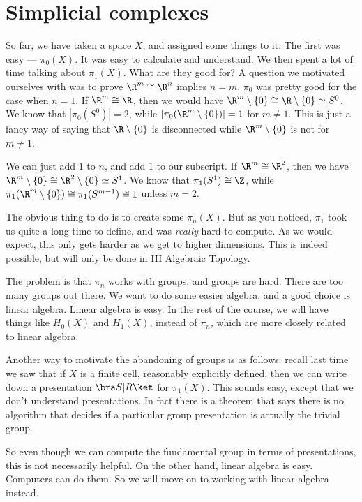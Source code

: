 \documentclass[a4paper]{article}
\begin{document}
\section{Simplicial complexes}
So far, we have taken a space $X$, and assigned some things to it. The first was easy --- $\pi_0(X)$. It was easy to calculate and understand. We then spent a lot of time talking about $\pi_1(X)$. What are they good for? A question we motivated ourselves with was to prove $\R^m \cong \R^n$ implies $n = m$. $\pi_0$ was pretty good for the case when $n = 1$. If $\R^m \cong \R$, then we would have $\R^m \setminus \{0\} \cong \R\setminus \{0\} \simeq S^0$. We know that $|\pi_0(S^0)| = 2$, while $|\pi_0(\R^m \setminus \{0\})| = 1$ for $m \not= 1$. This is just a fancy way of saying that $\R \setminus \{0\}$ is disconnected while $\R^m \setminus \{0\}$ is not for $m \not= 1$.

We can just add $1$ to $n$, and add $1$ to our subscript. If $\R^m \cong \R^2$, then we have $\R^m \setminus \{0\} \cong \R^2 \setminus \{0\} \simeq S^1$. We know that $\pi_1(S^1) \cong \Z$, while $\pi_1(\R^m \setminus \{0\}) \cong \pi_1(S^{m - 1}) \cong 1$ unless $m = 2$.

The obvious thing to do is to create some $\pi_n(X)$. But as you noticed, $\pi_1$ took us quite a long time to define, and was \emph{really} hard to compute. As we would expect, this only gets harder as we get to higher dimensions. This is indeed possible, but will only be done in III Algebraic Topology.

The problem is that $\pi_n$ works with groups, and groups are hard. There are too many groups out there. We want to do some easier algebra, and a good choice is linear algebra. Linear algebra is easy. In the rest of the course, we will have things like $H_0(X)$ and $H_1(X)$, instead of $\pi_n$, which are more closely related to linear algebra.

Another way to motivate the abandoning of groups is as follows: recall last time we saw that if $X$ is a finite cell, reasonably explicitly defined, then we can write down a presentation $\bra S | R\ket$ for $\pi_1 (X)$. This sounds easy, except that we don't understand presentations. In fact there is a theorem that says there is no algorithm that decides if a particular group presentation is actually the trivial group.

So even though we can compute the fundamental group in terms of presentations, this is not necessarily helpful. On the other hand, linear algebra is easy. Computers can do them. So we will move on to working with linear algebra instead.
\end{document}
